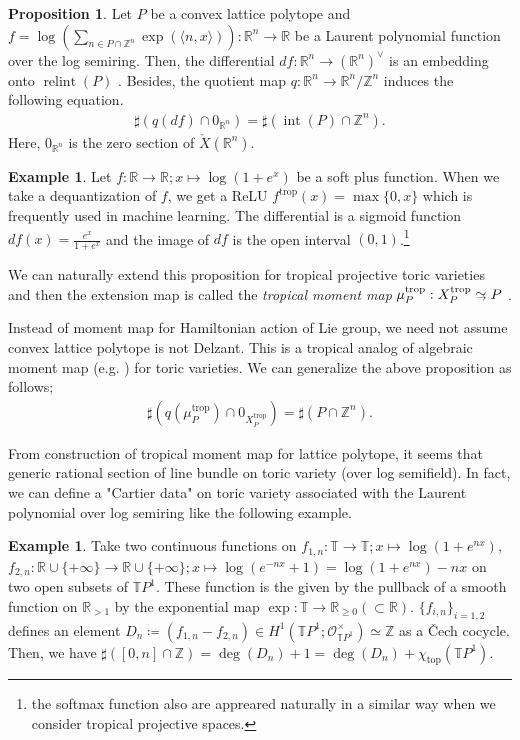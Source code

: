 \documentclass[a4paper,dvipdfmx,reqno,12pt]{amsart}
\theoremstyle{definition}
\newtheorem{Eg}[Thm]{Example}
\newtheorem{Prop}[Thm]{Proposition}
\newcommand{\deq}{\coloneqq}
\newcommand{\R}{\mathbb{R}}%
\newcommand{\Z}{\mathbb{Z}}%
\newcommand{\mb}[1]{\mathbb{#1}}%
\newcommand{\mcal}[1]{\mathcal{#1}}%
\newcommand{\opn}[1]{\operatorname{#1}}
\newcommand{\abk}[1]{\langle {#1} \rangle}%
\newcommand{\simto}{ 
\mathrel{\raisebox{0.13em}{${\sim}$}}
\kern -0.75em \mathrel{\raisebox{-0.11em}{${\scriptstyle \to}$}}  
}
\numberwithin{equation}{section}
\begin{document}
\begin{Prop}
Let $P$ be a convex lattice polytope and
$f=\log (\sum_{n\in P\cap \Z^{n}} \opn{exp}(\abk{n,x}))\colon \R^{n}\to \R$ be 
a Laurent polynomial function over the log semiring. Then,
 the differential
$df:\R^{n}\to (\R^{n})^{\vee}$ is an embedding onto $\opn{relint}(P)$
\cite[p.124 Exercise]{MR1301331}.
Besides, the quotient map $q: \R^{n}\to \R^{n}/\Z^{n}$ induces the following
equation.
\begin{align}
\sharp (q(df)\cap 0_{\R^{n}})=\sharp (\opn{int}(P)\cap \Z^{n}). 
\end{align}
Here, $0_{{\R}^{n}}$ is the zero section of $\check{X}(\R^{n})$.
\end{Prop}

\begin{Eg}
Let $f:\R \to \R; x\mapsto \log (1+e^{x})$ be a soft 
plus function. When we take a dequantization of $f$,
we get a ReLU $f^{\opn{trop}}(x)=\max\{0,x\}$ which 
is frequently used in machine learning.
The differential is a sigmoid function 
$df(x)=\frac{e^{x}}{1+e^{x}}$ and 
the image of $df$ is the open interval $(0,1)$.\footnote{
the softmax function also are appreared 
naturally in a similar way 
when we consider tropical projective spaces.}
\end{Eg}

We can naturally extend this proposition for tropical projective toric 
varieties and then the extension map is called the \emph{tropical moment map}
$\mu_{P}^{\opn{trop}}: X_{P}^{\opn{trop}}\simto P$ 
\cite[Definition 2.1 (2)]{MR2428356}.

Instead of moment map for Hamiltonian action of Lie group, we
need not assume convex lattice polytope is not Delzant.
This is a tropical analog of algebraic moment map 
(e.g. \cite[]{coxToricVarieties2011a}) for toric varieties.
We can generalize the above proposition as follows;
\begin{align}
\sharp (q(\mu_P^{\opn{trop}}) \cap 0_{X_P^{\opn{trop}}})
=\sharp (P \cap \Z^{n}).
\end{align}

From construction of tropical moment map for lattice polytope,
it seems that generic rational section of line bundle on 
toric variety (over log semifield).
In fact, we can define a "Cartier data" on toric variety
associated with the Laurent polynomial over log semiring like 
the following example. 
\begin{Eg} \label{eg: TP1Cartier}
Take two continuous functions on 
$f_{1,n}\colon \mb{T}\to \mb{T};x \mapsto \log (1+e^{nx})$,
$f_{2,n}\colon \mb{R}\cup\{+\infty\}\to \mb{R}\cup\{+\infty\};
x\mapsto \log(e^{-nx}+1)=\log(1+e^{nx})-nx$ on two open 
subsets of $\mb{T}P^{1}$. These function is the given 
by the pullback of a smooth function on $\R_{>1}$ by the 
exponential map $\opn{exp}:\mb{T}\to \R_{\geq 0} (\subset \R)$.
$\{f_{i,n}\}_{i=1,2}$ defines an element 
$D_n\deq (f_{1,n}-f_{2,n})\in 
H^{1}(\mb{T}P^1;\mcal{O}_{\mb{T}P^1}^{\times})\simeq \Z$
as a \v{C}ech cocycle.
Then, we have 
$\sharp([0,n]\cap \Z)=\opn{deg}(D_n)+1=\opn{deg}(D_n)+\chi_{\opn{top}}(\mb{T}P^1)$.
\end{Eg}
\end{document}
